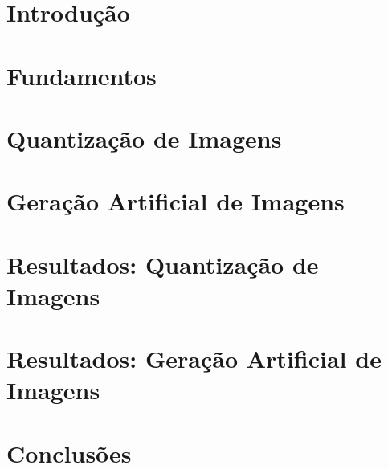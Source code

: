 \documentclass[mestrado, pre-defesa, english, brazil]{packages/icmc}
\begin{document}
\textual

\setcounter{page}{1}

\chapter{Introdução}
\label{cap:introducao}


\chapter{Fundamentos}
\label{cap:revisao}


\chapter{Quantização de Imagens}
\label{cap:quantization}


\chapter{Geração Artificial de Imagens}
\label{cap:metodo}


\chapter{Resultados: Quantização de Imagens}
\label{cap:resultados-quantizacao}


\chapter{Resultados: Geração Artificial de Imagens}
\label{cap:resultados-geracao}


\chapter{Conclusões}
\label{cap:conclusoes}


%

\postextual
\end{document}
